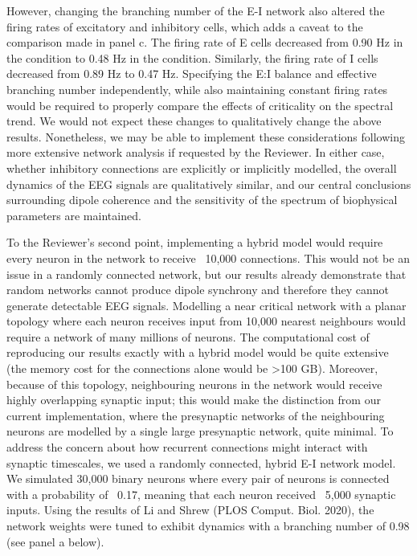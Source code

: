 However, changing the branching number of the E-I network also altered the firing rates of excitatory and inhibitory cells, which adds a caveat to the comparison made in panel c. The firing rate of E cells decreased from 0.90 Hz in the  condition to 0.48 Hz in the  condition. Similarly, the firing rate of I cells decreased from 0.89 Hz to 0.47 Hz. Specifying the E:I balance and effective branching number independently, while also maintaining constant firing rates would be required to properly compare the effects of criticality on the spectral trend. We would not expect these changes to qualitatively change the above results. Nonetheless, we may be able to implement these considerations following more extensive network analysis if requested by the Reviewer. In either case, whether inhibitory connections are explicitly or implicitly modelled, the overall dynamics of the EEG signals are qualitatively similar, and our central conclusions surrounding dipole coherence and the sensitivity of the spectrum of biophysical parameters are maintained.

To the Reviewer’s second point, implementing a hybrid model would require every neuron in the network to receive ~10,000 connections. This would not be an issue in a randomly connected network, but our results already demonstrate that random networks cannot produce dipole synchrony and therefore they cannot generate detectable EEG signals. Modelling a near critical network with a planar topology where each neuron receives input from 10,000 nearest neighbours would require a network of many millions of neurons. The computational cost of reproducing our results exactly with a hybrid model would be quite extensive (the memory cost for the connections alone would be >100 GB). Moreover, because of this topology, neighbouring neurons in the network would receive highly overlapping synaptic input; this would make the distinction from our current implementation, where the presynaptic networks of the neighbouring neurons are modelled by a single large presynaptic network, quite minimal.
To address the concern about how recurrent connections might interact with synaptic timescales, we used a randomly connected, hybrid E-I network model. We simulated 30,000 binary neurons where every pair of neurons is connected with a probability of ~0.17, meaning that each neuron received ~5,000 synaptic inputs. Using the results of Li and Shrew (PLOS Comput. Biol. 2020), the network weights were tuned to exhibit dynamics with a branching number of 0.98 (see panel a below).

